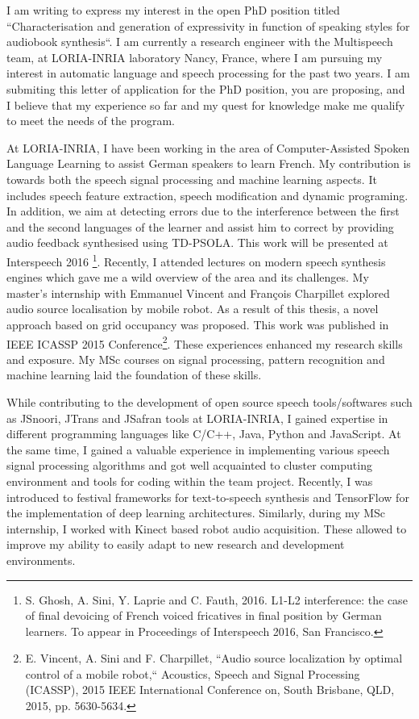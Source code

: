 \documentclass[12pt,stdletter,orderfromtodate,sigleft]{newlfm}
\begin{document}
\begin{newlfm}
I am writing to express my interest in the open PhD position titled ``Characterisation  and  generation  of  expressivity  in  function  of  speaking  styles  for  audiobook 
synthesis``. I am currently a research engineer with the Multispeech team, at LORIA-INRIA laboratory Nancy, France, where I am pursuing my interest in automatic language and speech processing for the past two years. I am submiting this letter of application for the PhD position, you are proposing, and I believe that my experience so far and my quest for knowledge make me qualify to meet the needs of the program. 
		
At LORIA-INRIA, I have been working in the area of Computer-Assisted Spoken Language Learning to assist German speakers to learn French. My contribution is towards both the speech signal processing and machine learning aspects. It includes speech feature extraction, speech modification and dynamic programing. In addition, we aim at detecting errors due to the interference between the first and the second languages of the learner and assist him to correct by providing audio feedback synthesised using TD\--PSOLA. This work will be presented at Interspeech 2016 \footnote{S. Ghosh, A. Sini, Y. Laprie and C. Fauth,  2016. L1-L2 interference: the case of final devoicing of French voiced fricatives in final position by German learners. To appear in Proceedings of Interspeech 2016, San Francisco.}. Recently, I attended lectures on modern speech synthesis engines which gave me a wild overview of the area and its challenges. My master's internship with Emmanuel Vincent and François Charpillet explored audio source localisation by mobile robot. As a result of this thesis, a novel approach based on grid occupancy was proposed. This work was published in IEEE ICASSP 2015 Conference\footnote{E. Vincent, A. Sini and F. Charpillet, ``Audio source localization by optimal control of a mobile robot,`` Acoustics, Speech and Signal Processing (ICASSP), 2015 IEEE International Conference on, South Brisbane, QLD, 2015, pp. 5630-5634.}. These experiences enhanced my research skills and exposure. My MSc courses on signal processing, pattern recognition and machine learning laid the foundation of these skills.   

		
While contributing to the development of open source speech tools/softwares such as JSnoori, JTrans and JSafran tools at LORIA-INRIA, I gained expertise in different programming languages like C/C++, Java, Python and JavaScript. At the same time, I gained a valuable experience in implementing  various speech signal processing algorithms and got well acquainted 	to cluster computing environment	and tools for coding within the team project. Recently, I was introduced to festival frameworks for text\--to\--speech synthesis and TensorFlow for the implementation of deep learning architectures. Similarly, during my MSc internship, I worked with Kinect based robot audio acquisition. These allowed to improve my ability to easily adapt to new research and development environments.    


\end{newlfm}
\end{document}
